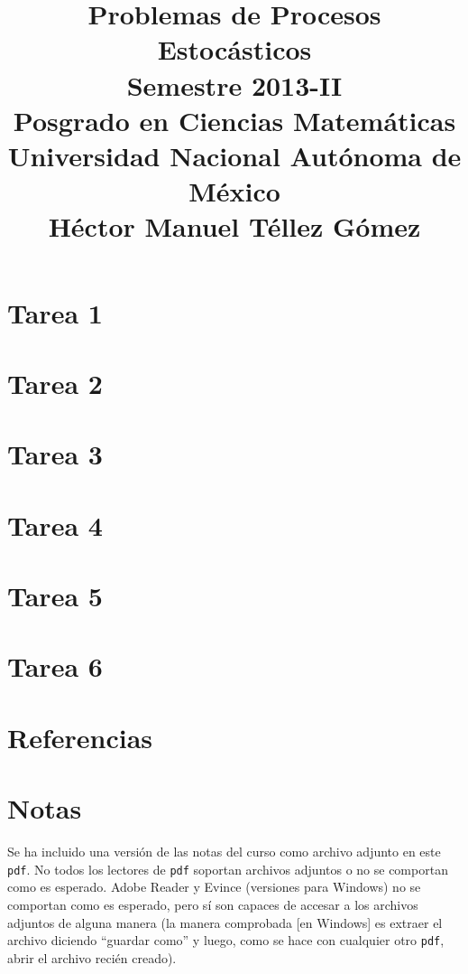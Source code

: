 \documentclass[a5paper,oneside]{amsart}
\title[Tarea de procesos estocásticos 2013-2]{
    Problemas de Procesos Estocásticos\\ 
    Semestre 2013-II\\ 
    Posgrado en Ciencias Matemáticas\\ 
    Universidad Nacional Autónoma de México\\
    Héctor Manuel Téllez Gómez
}
\theoremstyle{definition}
\numberwithin{section}{part}
\numberwithin{equation}{subsection}
\begin{document}
    \maketitle
    \part{Tarea 1}
                
        \nqed
        
    \part{Tarea 2}
                
        \nqed
        
    \part{Tarea 3}
                
        \nqed
            
    \part{Tarea 4}
                
        \nqed    
    
    \part{Tarea 5}
                
        \nqed
    
    \part{Tarea 6}
                
        \nqed
    
    \part*{Referencias}
        
        
        \newpage

    \part*{Notas}\label{notas}
        Se ha incluido una versión de las notas del curso como archivo adjunto en este \texttt{pdf}. No todos los lectores de \texttt{pdf} soportan 
        archivos adjuntos o no se comportan como es esperado. Adobe Reader y Evince (versiones para Windows) no se comportan como es esperado, 
        pero sí son capaces de accesar a los archivos adjuntos de alguna manera (la manera comprobada [en Windows] es extraer el archivo diciendo 
        ``guardar como'' y luego, como se hace con cualquier otro \texttt{pdf}, abrir el archivo recién creado).\pn
        
\end{document}
